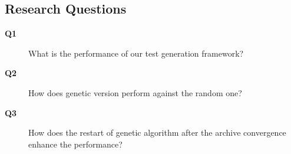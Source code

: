 \documentclass[sigconf]{acmart}
\begin{document}
\subsection{Research Questions}
\label{sub.sec.research.questions}


\begin{description}
\item[\textbf{Q1}] What is the performance of our test generation framework?
\item[\textbf{Q2}] How does genetic version perform against the random one?
\item[\textbf{Q3}] How does the restart of genetic algorithm after the archive convergence enhance the performance? 
\end{description}

% 
\end{document}
